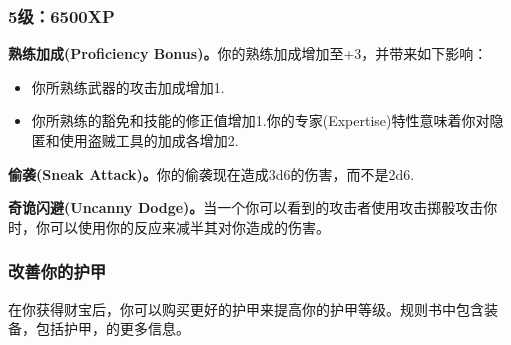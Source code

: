 \documentclass[letterpaper,twocolumn,openany,nodeprecatedcode]{dndbook}
\begin{document}
\subsubsection{5级：6500XP}
\textbf{熟练加成(Proficiency Bonus)。}你的熟练加成增加至+3，并带来如下影响：
\begin{itemize}
\item 你所熟练武器的攻击加成增加1.
\item 你所熟练的豁免和技能的修正值增加1.你的专家(Expertise)特性意味着你对隐匿和使用盗贼工具的加成各增加2.
\end{itemize}

\textbf{偷袭(Sneak Attack)。}你的偷袭现在造成3d6的伤害，而不是2d6.

\textbf{奇诡闪避(Uncanny Dodge)。}当一个你可以看到的攻击者使用攻击掷骰攻击你时，你可以使用你的反应来减半其对你造成的伤害。

\subsubsection{改善你的护甲}
在你获得财宝后，你可以购买更好的护甲来提高你的护甲等级。规则书中包含装备，包括护甲，的更多信息。






\end{document}
